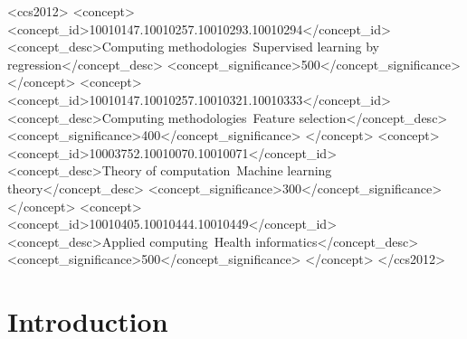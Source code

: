 \documentclass[sigconf, review=true]{acmart}
\begin{document}
\begin{CCSXML}
<ccs2012>
 <concept>
  <concept_id>10010147.10010257.10010293.10010294</concept_id>
  <concept_desc>Computing methodologies~Supervised learning by regression</concept_desc>
  <concept_significance>500</concept_significance>
 </concept>
 <concept>
  <concept_id>10010147.10010257.10010321.10010333</concept_id>
  <concept_desc>Computing methodologies~Feature selection</concept_desc>
  <concept_significance>400</concept_significance>
 </concept>
 <concept>
  <concept_id>10003752.10010070.10010071</concept_id>
  <concept_desc>Theory of computation~Machine learning theory</concept_desc>
  <concept_significance>300</concept_significance>
 </concept>
 <concept>
  <concept_id>10010405.10010444.10010449</concept_id>
  <concept_desc>Applied computing~Health informatics</concept_desc>
  <concept_significance>500</concept_significance>
 </concept>
</ccs2012>
\end{CCSXML}



\maketitle

\section{Introduction}
\end{document}

